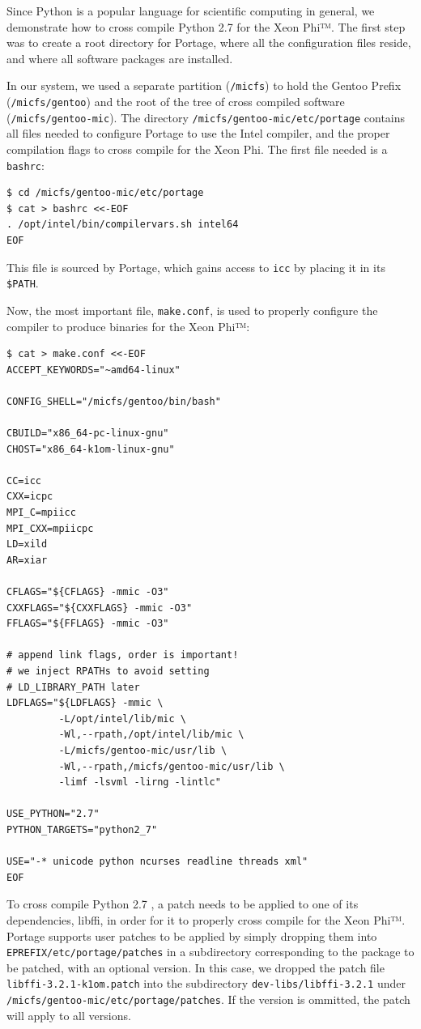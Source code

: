\documentclass[a4paper,conference]{IEEEtran}
\begin{document}
Since Python is a popular language for scientific computing in general,
we demonstrate how to cross compile Python 2.7 for the Xeon Phi™. The
first step was to create a root directory for Portage, where all the
configuration files reside, and where all software packages are
installed.

In our system, we used a separate partition (\verb|/micfs|) to hold the
Gentoo Prefix (\verb|/micfs/gentoo|) and the root of the tree of cross
compiled software (\verb|/micfs/gentoo-mic|). The directory
\verb|/micfs/gentoo-mic/etc/portage| contains all files needed to
configure Portage to use the Intel compiler, and the proper compilation
flags to cross compile for the Xeon Phi.
The first file needed is a \verb|bashrc|:
\begin{verbatim}
$ cd /micfs/gentoo-mic/etc/portage
$ cat > bashrc <<-EOF
. /opt/intel/bin/compilervars.sh intel64
EOF
\end{verbatim}
This file is sourced by Portage, which gains access to \verb|icc|
by placing it in its \verb|$PATH|.

Now, the most important file, \verb|make.conf|, is used to properly
configure the compiler to produce binaries for the Xeon Phi™:

{\footnotesize
\begin{verbatim}
$ cat > make.conf <<-EOF
ACCEPT_KEYWORDS="~amd64-linux"

CONFIG_SHELL="/micfs/gentoo/bin/bash"

CBUILD="x86_64-pc-linux-gnu"
CHOST="x86_64-k1om-linux-gnu"

CC=icc
CXX=icpc
MPI_C=mpiicc
MPI_CXX=mpiicpc
LD=xild
AR=xiar

CFLAGS="${CFLAGS} -mmic -O3"
CXXFLAGS="${CXXFLAGS} -mmic -O3"
FFLAGS="${FFLAGS} -mmic -O3"

# append link flags, order is important!
# we inject RPATHs to avoid setting
# LD_LIBRARY_PATH later
LDFLAGS="${LDFLAGS} -mmic \
         -L/opt/intel/lib/mic \
         -Wl,--rpath,/opt/intel/lib/mic \
         -L/micfs/gentoo-mic/usr/lib \
         -Wl,--rpath,/micfs/gentoo-mic/usr/lib \
         -limf -lsvml -lirng -lintlc"

USE_PYTHON="2.7"
PYTHON_TARGETS="python2_7"

USE="-* unicode python ncurses readline threads xml"
EOF
\end{verbatim}
}

To cross compile Python 2.7 \cite{python-k1om-youtube}, a patch
\cite{libffi-k1om} needs to be applied to one of its dependencies,
libffi, in order for it to properly cross compile for the Xeon Phi™.
Portage supports user patches to be applied by simply dropping them into
\verb|EPREFIX/etc/portage/patches| in a subdirectory corresponding to
the package to be patched, with an optional version. In this case, we
dropped the patch file \verb|libffi-3.2.1-k1om.patch| into the
subdirectory \verb|dev-libs/libffi-3.2.1| under
\verb|/micfs/gentoo-mic/etc/portage/patches|. If the version is
ommitted, the patch will apply to all versions.
\end{document}
